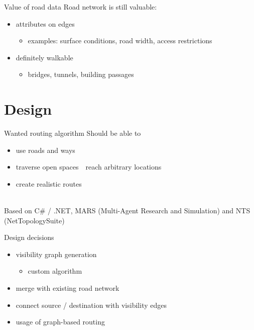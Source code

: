 \documentclass[xcolor={x11names}]{beamer}
\renewcommand{\n}{\hfill\\[0.5ex]}
\newcommand{\nn}{\hfill\\[2ex]}
\begin{document}
		\begin{frame}{Value of road data}
			Road network is still valuable:\n
			\begin{itemize}
				\item attributes on edges
				\begin{itemize}
					\item examples: surface conditions, road width, access restrictions
				\end{itemize}
				\item definitely walkable
				\begin{itemize}
					\item bridges, tunnels, building passages
				\end{itemize}
			\end{itemize}
		\end{frame}
	
	\section{Design}
	
		\begin{frame}{Wanted routing algorithm}
			Should be able to\n
			\begin{itemize}
				\item use roads and ways
				\item traverse open spaces\ \textrightarrow\ reach arbitrary locations
				\item create realistic routes
			\end{itemize}
			\nn
			\pause
			Based on C\# / .NET, MARS (Multi-Agent Research and Simulation) and NTS (NetTopologySuite)
		\end{frame}
		
		\begin{frame}{Design decisions}
			\begin{itemize}
				\item visibility graph generation
				\begin{itemize}
					\item custom algorithm
				\end{itemize}
				\item merge with existing road network
				\item connect source / destination with visibility edges
				\item usage of graph-based routing
			\end{itemize}
		\end{frame}
		
\end{document}
